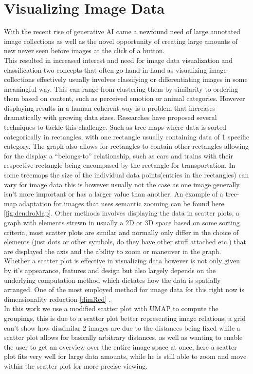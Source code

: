 \documentclass[
  a4paper,  %
  twoside,  %
  bibliography=totoc,
  headsepline,
  cleardoublepage=empty,
  parskip=half,
  draft=false
]{scrbook}
\begin{document}
\section{Visualizing Image Data}
With the recent rise of generative AI came a newfound need of large annotated image collections as well as the novel opportunity of creating large amounts of new never seen before images at the click of a button.\\This resulted in increased interest and need for image data visualization and classification two concepts that often go hand-in-hand as visualizing image collections effectively usually involves classifying or differentiating images in some meaningful way. This can range from clustering them by similarity to ordering them based on content, such as perceived emotion or animal categories. However displaying results in a human coherent way is a problem that increases dramatically with growing data sizes. Researches have proposed several techniques to tackle this challenge. Such as tree maps where data is sorted categorically in rectangles, with one rectangle usually containing data of 1 specific category. The graph also allows for rectangles to contain other rectangles allowing for the display a \enquote{belongs-to} relationship, such as cars and trains with their respective rectangle being encompased by the rectangle for transportation. In some treemaps the size of the individual data points(entries in the rectangles) can vary for image data this is however usually not the case as one image generally isn't more important or has a larger value than another. An example of a tree-map adaptation for images that uses semantic zooming can be found here \cite{dendromap} \cref{fig:dendroMap}.
 Other methods involves displaying the data in scatter plots, a graph with elements strewn in usually a 2D or 3D  space based on some sorting criteria, most scatter plots are similar and normally only differ in the choice of elements (just dots or other symbols, do they have other stuff attached etc.) that are displayed the axis and the ability to zoom or maneuver in the graph. Whether a scatter plot is effective in visualizing data however is not only given by it's appearance, features and design but also largely depends on the underlying computation method which dictates how the data is spatially arranged. One of the most employed method for image data for this right now is dimensionality reduction \cref{dimRed} \cite{CDR,umap}.\\
 In this work we use a modified scatter plot with UMAP to compute the groupings, this is due to a scatter plot better representing image relations, a grid can't show how dissimilar 2 images are due to the distances being fixed while a scatter plot allows for basically arbitrary distances, as well as wanting to enable the user to get an overview over the entire image space at once, here a scatter plot fits very well for large data amounts, while he is still able to zoom and move within the scatter plot for more precise viewing. 
\end{document}
